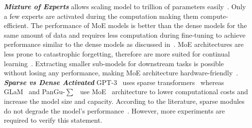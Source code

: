 \emph{\textbf{Mixture of Experts}} allows scaling model to trillion of parameters easily~\cite{PanGu_sigma, du2022glam}. Only a few experts are activated during the computation making them compute-efficient. The performance of MoE models is better than the dense models for the same amount of data and requires less computation during fine-tuning to achieve performance similar to the dense models as discussed in~\cite{du2022glam}. MoE architectures are less prone to catastrophic forgetting, therefore are more suited for continual learning~\cite{PanGu_sigma}. Extracting smaller sub-models for downstream tasks is possible without losing any performance, making MoE architecture hardware-friendly~\cite {PanGu_sigma}.    \\
\emph{\textbf{Sparse vs Dense Activated}}
GPT-3~\cite{GPT-3} uses sparse transformers~\cite{sparse_transformer} whereas GLaM~\cite{du2022glam} and PanGu-$\sum$~\cite{PanGu_sigma} use MoE~\cite{shazeer2017outrageously} architecture to lower computational costs and increase the model size and capacity. According to the literature, sparse modules do not degrade the model's performance~\cite{sparse_transformer}. However, more experiments are required to verify this statement.  \\

